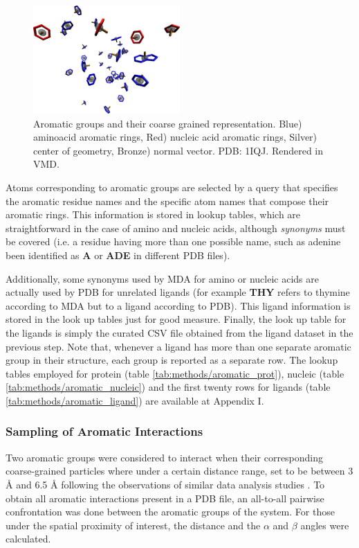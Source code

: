       \begin{figure}[H]
        \centering
        \includegraphics[width=0.5\textwidth]{figures/methods/aromatic.png}
        \caption{\label{fig:methods/aromatic} Aromatic groups and their coarse grained representation. Blue) aminoacid aromatic rings, Red) nucleic acid aromatic rings, Silver) center of geometry, Bronze) normal vector. PDB: 1IQJ. Rendered in VMD.}
      \end{figure}

      Atoms corresponding to aromatic groups are selected by a query that specifies the aromatic residue names and the specific atom names that compose their aromatic rings. This information is stored in lookup tables, which are straightforward in the case of amino and nucleic acids, although \textit{synonyms} must be covered (i.e. a residue having more than one possible name, such as adenine been identified as \textbf{A} or \textbf{ADE} in different PDB files).

      Additionally, some synonyms used by MDA for amino or nucleic acids are actually used by PDB for unrelated ligands (for example \textbf{THY} refers to thymine according to MDA but to a ligand according to PDB). This ligand information is stored in the look up tables just for good measure. Finally, the look up table for the ligands is simply the curated CSV file obtained from the ligand dataset in the previous step. Note that, whenever a ligand has more than one separate aromatic group in their structure, each group is reported as a separate row. The lookup tables employed for protein (table \ref{tab:methods/aromatic_prot}), nucleic (table \ref{tab:methods/aromatic_nucleic}) and the first twenty rows for ligands (table \ref{tab:methods/aromatic_ligand}) are available at Appendix I.

    \subsubsection{Sampling of Aromatic Interactions}
      Two aromatic groups were considered to interact when their corresponding coarse-grained particles where under a certain distance range, set to be between {3 \AA} and {6.5 \AA} following the observations of similar data analysis studies \cite{aromatic_2018}. To obtain all aromatic interactions present in a PDB file, an all-to-all pairwise confrontation was done between the aromatic groups of the system. For those under the spatial proximity of interest, the distance and the $\alpha$ and $\beta$ angles were calculated.

